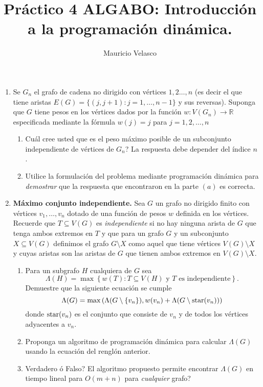 \documentclass[12pt, a4paper]{article}
\date{}
\begin{document}
\title{Pr\'actico 4 ALGABO: Introducción a la programaci\'on dinámica.}
\author{Mauricio Velasco}
\maketitle{}
\begin{enumerate} 



\item Se $G_n$ el grafo de cadena no dirigido con v\'ertices $1,2\dots, n$ (es decir el que tiene aristas $E(G)=\{(j,j+1): j=1,\dots,n-1 \}$ y sus reversas). Suponga que $G$ tiene pesos en los v\'ertices dados por la funci\'on $w: V(G_n)\rightarrow \mathbb{R}$ especificada mediante la fórmula $w(j)=j$ para $j=1,2,\dots, n$ 
\begin{enumerate}
\item Cuál cree usted que es el peso m\'aximo  posible de un subconjunto independiente de vértices de $G_n$? La respuesta debe depender del \'indice $n$.
\item Utilice la formulaci\'on del problema mediante programaci\'on din\'amica para {\it demostrar} que la respuesta que encontraron en la parte $(a)$ es correcta.
\end{enumerate}

\item {\bf M\'aximo conjunto independiente.}  Sea $G$ un grafo no dirigido finito con v\'ertices $v_1,\dots , v_n$ dotado de una funci\'on de pesos $w$ definida en los v\'ertices. Recuerde que $T\subseteq V(G)$ es {\it independiente} si no hay ninguna arista de $G$ que tenga ambos extremos en $T$ y que para un grafo $G$ y un subconjunto $X\subseteq V(G)$ definimos el grafo $G\setminus X$ como aquel que tiene v\'ertices $V(G)\setminus X$ y cuyas aristas son las aristas de $G$ que tienen ambos extremos en $V(G)\setminus X$.
\begin{enumerate}
\item Para un subgrafo $H$ cualquiera de $G$ sea 
\[\Lambda(H)=\max\left\{ w(T): T\subseteq V(H)\text{ y $T$ es independiente}\right\}.\] 
Demuestre que la siguiente ecuaci\'on se cumple 
\[\Lambda(G) = \max\left( \Lambda(G\setminus\{v_n\}), w(v_n) + \Lambda(G\setminus {\rm star}(v_n))\right)\]
donde ${\rm star}(v_n)$ es el conjunto que consiste de $v_n$ y de todos los v\'ertices adyacentes a $v_n$.
\item Proponga un algoritmo de programaci\'on din\'amica para calcular $\Lambda(G)$ usando la ecuaci\'on del rengl\'on anterior.
\item Verdadero \'o Falso? El algoritmo propuesto permite encontrar $\Lambda(G)$ en tiempo lineal para $O(m+n)$ para {\it cualquier} grafo?
\end{enumerate}


\end{enumerate}
\end{document}
